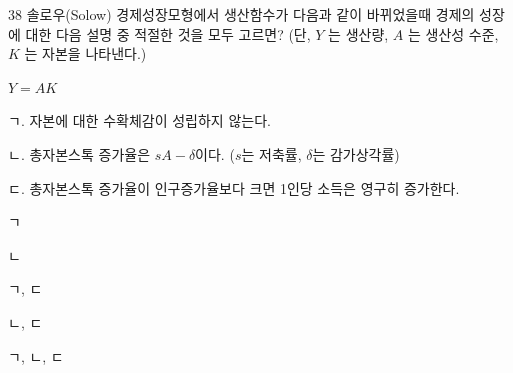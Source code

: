 \begin{question}{38}
솔로우(Solow) 경제성장모형에서 생산함수가 다음과 같이 바뀌었을때 경제의 성장에 대한 다음 설명 중 적절한 것을 모두 고르면? (단, $Y$ 는 생산량, $A$ 는 생산성 수준, $K$ 는 자본을 나타낸다.)
\begin{center}$Y = AK$\end{center}
\begin{framedtext}
ㄱ. 자본에 대한 수확체감이 성립하지 않는다. \par
ㄴ. 총자본스톡 증가율은 $sA- \delta$이다. ($s$는 저축률, $\delta$는 감가상각률) \par
ㄷ. 총자본스톡 증가율이 인구증가율보다 크면 1인당 소득은 영구히 증가한다. \par
\end{framedtext}
\begin{choices}
  \item ㄱ
  \item ㄴ
  \item ㄱ, ㄷ
  \item ㄴ, ㄷ
  \item ㄱ, ㄴ, ㄷ
\end{choices}
\end{question}
